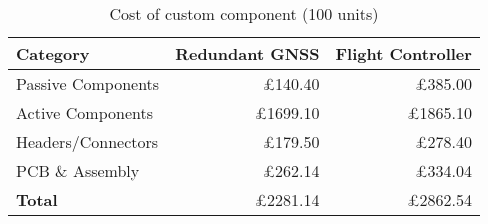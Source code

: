 \begin{table}[htbp]
  \centering
  \begin{tabular}{|l|r|r|}
    \hline
    \textbf{Category}         & \textbf{Redundant GNSS} & \textbf{Flight Controller}\\ 
    \hline
    Passive Components        & £140.40  & £385.00\\
    Active Components         & £1699.10 & £1865.10\\
    Headers/Connectors        & £179.50  & £278.40\\
    PCB \& Assembly           & £262.14  & £334.04\\
    \hline
    \textbf{Total}            & £2281.14 & £2862.54\\
    \hline
  \end{tabular}
  \caption{Cost of custom component (100 units)}
  \label{tab:aggregated-cost}
\end{table}